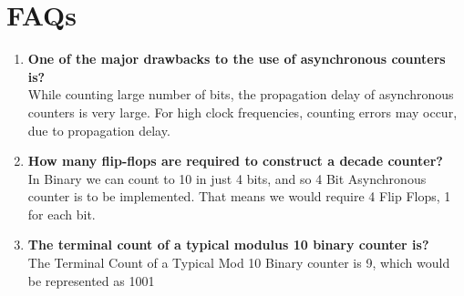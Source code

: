\documentclass[11pt]{article}
\begin{document}
\section{FAQs}

\begin{enumerate}
	\item \textbf{One of the major drawbacks to the use of asynchronous counters is?}\\
	While counting large number of bits, the propagation delay of asynchronous counters is very large.	For high clock frequencies, counting errors may occur, due to propagation delay.	
	\item \textbf{How many flip-flops are required to construct a decade counter?}\\
	In Binary we can count to 10 in just 4 bits, and so 4 Bit Asynchronous counter is to be implemented. That means we would require 4 Flip Flops, 1 for each bit. 
	\item \textbf{The terminal count of a typical modulus 10 binary counter is?}\\
	The Terminal Count of a Typical Mod 10 Binary counter is 9, which would be represented as 1001
\end{enumerate}
\end{document}
